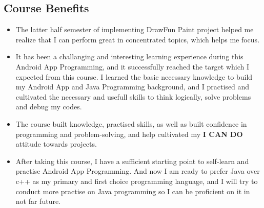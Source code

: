 \documentclass[9pt,b5paper]{article}
\begin{document}
\subsection{Course Benefits}
\label{sec-7-2}
\begin{itemize}
\item The latter half semester of implementing DrawFun Paint project helped me realize that I can perform great in concentrated topics, which helps me focus.
\item It has been a challanging and interesting learning experience during this Android App Programming, and it successfully reached the target which I expected from this course. I learned the basic necessary knowledge to build my Android App and Java Programming background, and I practised and cultivated the necessary and usefull skills to think logically, solve problems and debug my codes.
\item The course built knowledge, practised skills, as well as built confidence in programming and problem-solving, and help cultivated my \textbf{I CAN DO} attitude towards projects.
\item After taking this course, I have a sufficient starting point to self-learn and practise Android App Programming. And now I am ready to prefer Java over c++ as my primary and first choice programming language, and I will try to conduct more practise on Java programming so I can be proficient on it in not far future.
\end{itemize}
\end{document}
